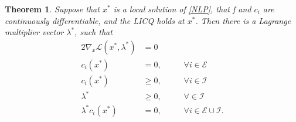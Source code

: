 \documentclass[a4paper,10 pt,titlepage,twoside]{book}
\theoremstyle{plain}
\newtheorem{thm}{Theorem}[chapter]
\theoremstyle{definition}
\theoremstyle{remark}
\begin{document}
\begin{thm}\label{thm:kkt}
Suppose that $x^{*}$ is a local solution of \ref{NLP}, that f and $c_{i}$ are continuously differentiable, and the LICQ holds at $x^{*}$. Then there is a Lagrange multiplier vector $\lambda^{*}$, such that 
\begin{alignat*}{2}
\nabla_{x}\mathcal{L}(x^{*},\lambda^{*})&=0&&\\
c_{i}(x^{*})&=0, &&\;\;\;\;\forall i\in\mathcal{E}\\
c_{i}(x^{*})&\geq 0, &&\;\;\;\;\forall i\in\mathcal{I}\\
\lambda^{*} &\geq 0, &&\;\;\;\;\forall \in\mathcal{I}\\
\lambda^{*}c_{i}(x^{*})&= 0,&&\;\;\;\;\forall i\in\mathcal{E}\cup\mathcal{I}.\label{CompCon}\\
\end{alignat*} 
\end{thm}
\end{document}
